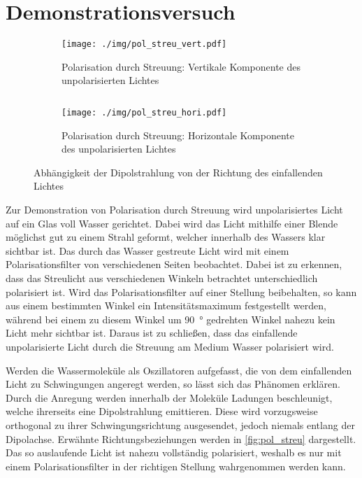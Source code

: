 \chapter{Demonstrationsversuch}
\begin{figure}[tb]
	\begin{subfigure}{.4\textwidth}
		\centering
		\texttt{[image: ./img/pol\_streu\_vert.pdf]}
		\caption[Vertikale Komponente]{Polarisation durch Streuung: Vertikale Komponente des unpolarisierten Lichtes}
	\end{subfigure}
	$\quad$
	\begin{subfigure}{.4\textwidth}
		\centering
		\texttt{[image: ./img/pol\_streu\_hori.pdf]}
		\caption[Horizontale Komponente]{Polarisation durch Streuung: Horizontale Komponente des unpolarisierten Lichtes}
	\end{subfigure}
	\caption[Visualisierung der Richtungsabhängigkeiten]{Abhängigkeit der Dipolstrahlung von der Richtung des einfallenden Lichtes}
	\label{fig:pol_streu}
\end{figure}

Zur Demonstration von Polarisation durch Streuung wird unpolarisiertes Licht auf ein Glas voll Wasser gerichtet.
Dabei wird das Licht mithilfe einer Blende möglichst gut zu einem Strahl geformt, welcher innerhalb des Wassers klar sichtbar ist.
Das durch das Wasser gestreute Licht wird mit einem Polarisationsfilter von verschiedenen Seiten beobachtet.
Dabei ist zu erkennen, dass das Streulicht aus verschiedenen Winkeln betrachtet unterschiedlich polarisiert ist.
Wird das Polarisationsfilter auf einer Stellung beibehalten, so kann aus einem bestimmten Winkel ein Intensitätsmaximum festgestellt werden, während bei einem zu diesem Winkel um \SI{90}{\degree} gedrehten Winkel nahezu kein Licht mehr sichtbar ist.
Daraus ist zu schließen, dass das einfallende unpolarisierte Licht durch die Streuung am Medium Wasser polarisiert wird.\par
Werden die Wassermoleküle als Oszillatoren aufgefasst, die von dem einfallenden Licht zu Schwingungen angeregt werden, so lässt sich das Phänomen erklären.
Durch die Anregung werden innerhalb der Moleküle Ladungen beschleunigt, welche ihrerseits eine Dipolstrahlung emittieren.
Diese wird vorzugsweise orthogonal zu ihrer Schwingungsrichtung ausgesendet, jedoch niemals entlang der Dipolachse.
Erwähnte Richtungsbeziehungen werden in \autoref{fig:pol_streu} dargestellt.
Das so auslaufende Licht ist nahezu vollständig polarisiert, weshalb es nur mit einem Polarisationsfilter in der richtigen Stellung wahrgenommen werden kann.
